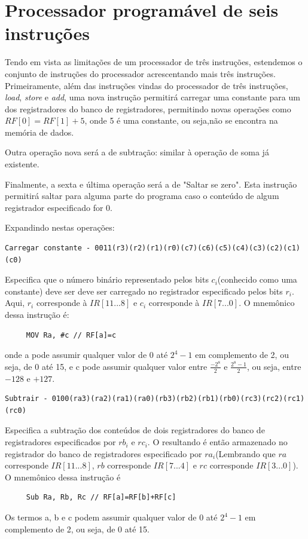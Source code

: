 \documentclass{article}
\begin{document}
\section{Processador programável de seis instruções}
Tendo em vista as limitações de um processador de três instruções, estendemos o conjunto de instruções do processador acrescentando mais três instruções.
Primeiramente, além das instruções vindas do processador de três instruções, \textit{load}, \textit{store} e \textit{add}, uma nova instrução permitirá carregar uma constante para um dos registradores do banco de registradores, permitindo novas operações como $RF[0]=RF[1]+5$, onde 5 é uma constante, ou seja,não se encontra na memória de dados.

Outra operação nova será a de subtração: similar à operação de soma já existente.

Finalmente, a sexta e última operação será a de "Saltar se zero". Esta instrução permitirá saltar para alguma parte do programa caso o conteúdo de algum registrador especificado for 0.

Expandindo nestas operações:

\begin{boxedd}
\begin{lstlisting}
Carregar constante - 0011(r3)(r2)(r1)(r0)(c7)(c6)(c5)(c4)(c3)(c2)(c1)(c0)
\end{lstlisting}    
Especifica que o número binário representado pelos bits $c_i$(conhecido como uma constante) deve ser deve ser carregado no registrador especificado pelos bits $r_i$. Aqui, $r_i$ corresponde à $IR[11...8]$ e $c_i$ corresponde à $IR[7...0]$. O mnemônico dessa instrução é:
\begin{lstlisting}
     MOV Ra, #c // RF[a]=c     
\end{lstlisting}
onde a pode assumir qualquer valor de 0 até $2^4 - 1$ em complemento de 2, ou seja, de 0 até 15, e c pode assumir qualquer valor entre $\frac{-2^8}{2}$ e $\frac{2^8-1}{2}$, ou seja, entre $-128$ e $+127$.
\end{boxedd}


\begin{boxedd}
\begin{lstlisting}
Subtrair - 0100(ra3)(ra2)(ra1)(ra0)(rb3)(rb2)(rb1)(rb0)(rc3)(rc2)(rc1)(rc0)
\end{lstlisting}    
Especifica a subtração dos conteúdos de dois registradores do banco de registradores especificados por $rb_i$ e $rc_i$. O resultando é então armazenado no registrador do banco de registradores especificado por $ra_i$(Lembrando que $ra$ corresponde $IR[11...8]$, $rb$ corresponde $IR[7...4]$ e $rc$ corresponde $IR[3...0]$). O mnemônico dessa instrução é
\begin{lstlisting}
     Sub Ra, Rb, Rc // RF[a]=RF[b]+RF[c]     
\end{lstlisting}
Os termos a, b e c podem assumir qualquer valor de 0 até $2^4 - 1$ em complemento de 2, ou seja, de 0 até 15. 
\end{boxedd}
\end{document}
